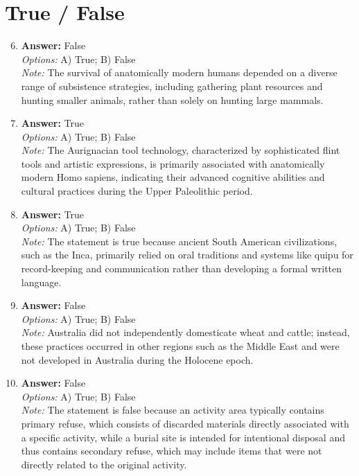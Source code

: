 \documentclass[12pt]{article}
\begin{document}
\section*{True / False}
\begin{enumerate}[label=\arabic*.]
\setcounter{enumi}{5}
\item \textbf{Answer:} False
\\ \textit{Options:} A) True; B) False
\\ \textit{Note:} The survival of anatomically modern humans depended on a diverse range of subsistence strategies, including gathering plant resources and hunting smaller animals, rather than solely on hunting large mammals.
\item \textbf{Answer:} True
\\ \textit{Options:} A) True; B) False
\\ \textit{Note:} The Aurignacian tool technology, characterized by sophisticated flint tools and artistic expressions, is primarily associated with anatomically modern Homo sapiens, indicating their advanced cognitive abilities and cultural practices during the Upper Paleolithic period.
\item \textbf{Answer:} True
\\ \textit{Options:} A) True; B) False
\\ \textit{Note:} The statement is true because ancient South American civilizations, such as the Inca, primarily relied on oral traditions and systems like quipu for record-keeping and communication rather than developing a formal written language.
\item \textbf{Answer:} False
\\ \textit{Options:} A) True; B) False
\\ \textit{Note:} Australia did not independently domesticate wheat and cattle; instead, these practices occurred in other regions such as the Middle East and were not developed in Australia during the Holocene epoch.
\item \textbf{Answer:} False
\\ \textit{Options:} A) True; B) False
\\ \textit{Note:} The statement is false because an activity area typically contains primary refuse, which consists of discarded materials directly associated with a specific activity, while a burial site is intended for intentional disposal and thus contains secondary refuse, which may include items that were not directly related to the original activity.
\end{enumerate}
\end{document}
